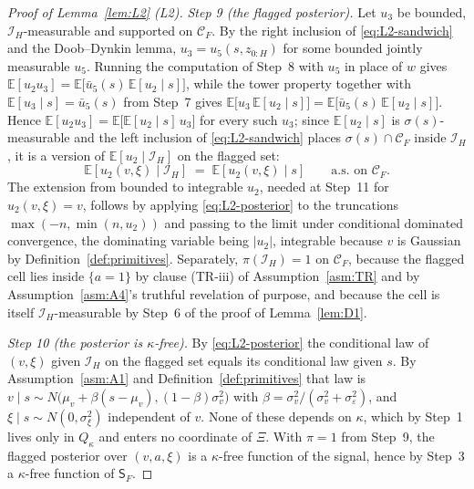 \documentclass[11pt]{article}
\newcommand{\Eop}{\mathbb{E}}
\newcommand{\Sfl}{\mathsf{S}_F}
\begin{document}
\begin{proof}[Proof of Lemma~\ref{lem:L2} (L2)]
\emph{Step 9 (the flagged posterior).} Let $u_3$ be bounded, $\mathcal I_H$-measurable and supported
on $\mathcal C_F$. By the right inclusion of \eqref{eq:L2-sandwich} and the Doob--Dynkin lemma,
$u_3 = u_5(s,z_{0:H})$ for some bounded jointly measurable $u_5$. Running the computation of Step~8
with $u_5$ in place of $w$ gives $\Eop[u_2u_3] = \Eop\bigl[\bar u_5(s)\,\Eop[u_2 \mid s]\bigr]$,
while the tower property together with $\Eop[u_3 \mid s] = \bar u_5(s)$ from Step~7 gives
$\Eop\bigl[u_3\,\Eop[u_2 \mid s]\bigr] = \Eop\bigl[\bar u_5(s)\,\Eop[u_2 \mid s]\bigr]$. Hence
$\Eop[u_2u_3] = \Eop\bigl[\Eop[u_2 \mid s]\,u_3\bigr]$ for every such $u_3$; since
$\Eop[u_2 \mid s]$ is $\sigma(s)$-measurable and the left inclusion of \eqref{eq:L2-sandwich} places
$\sigma(s) \cap \mathcal C_F$ inside $\mathcal I_H$, it is a version of $\Eop[u_2 \mid \mathcal I_H]$
on the flagged set:
\begin{equation}
\label{eq:L2-posterior}
\Eop[u_2(v,\xi) \mid \mathcal I_H] \;=\; \Eop[u_2(v,\xi) \mid s]
 \qquad \text{a.s.\ on } \mathcal C_F .
\end{equation}
The extension from bounded to integrable $u_2$, needed at Step~11 for $u_2(v,\xi) = v$, follows by
applying \eqref{eq:L2-posterior} to the truncations $\max(-n,\min(n,u_2))$ and passing to the limit
under conditional dominated convergence, the dominating variable being $|u_2|$, integrable because
$v$ is Gaussian by Definition~\ref{def:primitives}. Separately, $\pi(\mathcal I_H) = 1$ on
$\mathcal C_F$, because the flagged cell lies inside $\{a=1\}$ by clause (TR-iii) of
Assumption~\ref{asm:TR} and by Assumption~\ref{asm:A4}'s truthful revelation of purpose, and because
the cell is itself $\mathcal I_H$-measurable by Step~6 of the proof of Lemma~\ref{lem:D1}.

\emph{Step 10 (the posterior is $\kappa$-free).} By \eqref{eq:L2-posterior} the conditional law of
$(v,\xi)$ given $\mathcal I_H$ on the flagged set equals its conditional law given $s$. By
Assumption~\ref{asm:A1} and Definition~\ref{def:primitives} that law is
$v \mid s \sim N\bigl(\mu_v+\beta(s-\mu_v),(1-\beta)\sigma_v^2\bigr)$ with
$\beta = \sigma_v^2/(\sigma_v^2+\sigma_\varepsilon^2)$, and $\xi \mid s \sim N(0,\sigma_\xi^2)$
independent of $v$. None of these depends on $\kappa$, which by Step~1 lives only in $Q_\kappa$ and
enters no coordinate of $\Xi$. With $\pi = 1$ from Step~9, the flagged posterior over $(v,a,\xi)$ is
a $\kappa$-free function of the signal, hence by Step~3 a $\kappa$-free function of $\Sfl$.


\end{proof}
\end{document}
